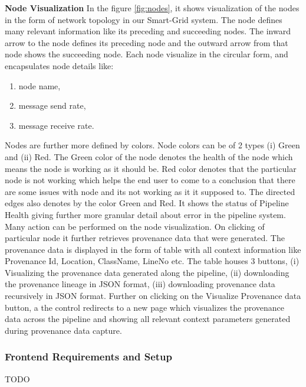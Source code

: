 \textbf{Node Visualization} In the figure \ref{fig:nodes}, it shows visualization of the nodes in the form of network topology in our  Smart-Grid system. The node defines many relevant information like its preceding and succeeding nodes. The inward arrow to the node defines its preceding node and the outward arrow from that node shows the succeeding node. Each node visualize in the circular form, and encapsulates node details like:
\begin{enumerate}
    \item node name,
    \item message send rate,
    \item message receive rate.
\end{enumerate}
Nodes are further more defined by colors. Node colors can be of 2 types (i) Green and (ii) Red. The Green color of the node denotes the health of the node which means the node is working as it should be. Red color denotes that the particular node is not working which helps the end user to come to a conclusion that there are some issues with node and its not working as it it supposed to. The directed edges also denotes by the color Green and Red. It shows the status of Pipeline Health giving further more granular detail about error in the pipeline system.
\newline
Many action can be performed on the node visualization. On clicking of particular node it further retrieves provenance data that were generated. The provenance data is displayed in the form of table with all context information like Provenance Id, Location, ClassName, LineNo etc. The table houses 3 buttons, (i) Visualizing the provenance data generated along the pipeline, (ii) downloading the provenance lineage in JSON format, (iii) downloading provenance data recursively in JSON format.
\newline
Further on clicking on the Visualize Provenance data button, a the control redirects to a new page which visualizes the provenance data across the pipeline and showing all relevant context parameters generated during provenance data capture.


\subsubsection{Frontend Requirements and Setup}
TODO